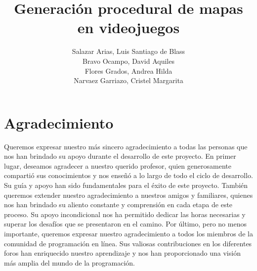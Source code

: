 \documentclass[stu, 12pt, letterpaper, donotrepeattitle, floatsintext, natbib]{apa7}
\title{\Large Generación procedural de mapas en videojuegos}
\author{ Salazar Arias, Luis Santiago de Blass \\Bravo Ocampo, David Aquiles \\Flores Grados, Andrea Hilda \\ Narvaez Garriazo, Cristel Margarita
}
\affiliation{\Huge\textbf{Universidad San Ignacio de Loyola}}
\begin{document}
\maketitle




\renewcommand\contentsname{\largeÍndice}
\tableofcontents
\setcounter{tocdepth}{2}
\newpage
\renewcommand{\listfigurename}{\largeÍndice de fíguras}
\listoffigures
\newpage
\renewcommand{\listtablename}{\largeÍndice de tablas}
\listoftables
\newpage

\section{\large Agradecimiento}
Queremos expresar nuestro más sincero agradecimiento a todas las personas que nos han brindado su apoyo durante el desarrollo de este proyecto. En primer lugar, deseamos agradecer a nuestro querido profesor, quien generosamente compartió sus conocimientos y nos enseñó a lo largo de todo el ciclo de desarrollo. Su guía y apoyo han sido fundamentales para el éxito de este proyecto.
También queremos extender nuestro agradecimiento a nuestros amigos y familiares, quienes nos han brindado su aliento constante y comprensión en cada etapa de este proceso. Su apoyo incondicional nos ha permitido dedicar las horas necesarias y superar los desafíos que se presentaron en el camino.
Por último, pero no menos importante, queremos expresar nuestro agradecimiento a todos los miembros de la comunidad de programación en línea. Sus valiosas contribuciones en los diferentes foros han enriquecido nuestro aprendizaje y nos han proporcionado una visión más amplia del mundo de la programación.
\end{document}
